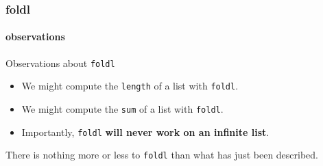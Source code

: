 \begin{frame}[fragile]
\frametitle{foldl}
\framesubtitle{observations}

\begin{block}{Observations about \lstinline[basicstyle=\ttfamily]$foldl$}
\begin{itemize}
\item We might compute the \lstinline[basicstyle=\ttfamily]$length$ of a list with \lstinline[basicstyle=\ttfamily]$foldl$.
\item We might compute the \lstinline[basicstyle=\ttfamily]$sum$ of a list with \lstinline[basicstyle=\ttfamily]$foldl$.
\item Importantly, \lstinline[basicstyle=\ttfamily]$foldl$ \textbf{will never work on an infinite list}.
\end{itemize}
\end{block}

\hrulefill

There is nothing more or less to \lstinline[basicstyle=\ttfamily]$foldl$ than what has just been described.

\end{frame}
